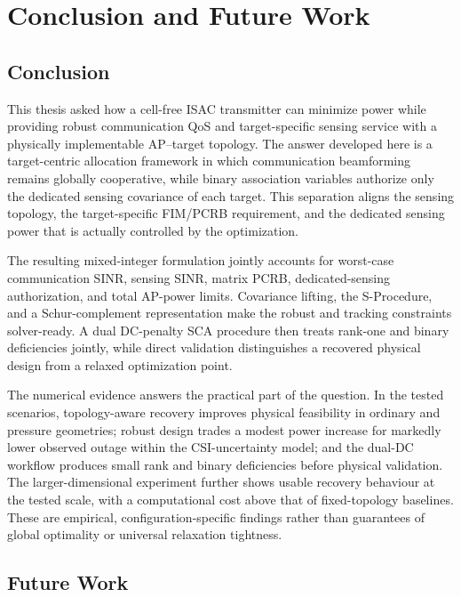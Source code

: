\chapter{Conclusion and Future Work}\label{ch:future_work}

\section{Conclusion}

This thesis asked how a cell-free ISAC transmitter can minimize power while
providing robust communication QoS and target-specific sensing service with a
physically implementable AP--target topology. The answer developed here is a
target-centric allocation framework in which communication beamforming remains
globally cooperative, while binary association variables authorize only the
dedicated sensing covariance of each target. This separation aligns the sensing
topology, the target-specific FIM/PCRB requirement, and the dedicated sensing
power that is actually controlled by the optimization.

The resulting mixed-integer formulation jointly accounts for worst-case
communication SINR, sensing SINR, matrix PCRB, dedicated-sensing authorization,
and total AP-power limits. Covariance lifting, the S-Procedure, and a
Schur-complement representation make the robust and tracking constraints
solver-ready. A dual DC-penalty SCA procedure then treats rank-one and binary
deficiencies jointly, while direct validation distinguishes a recovered
physical design from a relaxed optimization point.

The numerical evidence answers the practical part of the question. In the
tested scenarios, topology-aware recovery improves physical feasibility in
ordinary and pressure geometries; robust design trades a modest power increase
for markedly lower observed outage within the CSI-uncertainty model; and the
dual-DC workflow produces small rank and binary deficiencies before physical
validation. The larger-dimensional experiment further shows usable recovery
behaviour at the tested scale, with a computational cost above that of
fixed-topology baselines. These are empirical, configuration-specific findings
rather than guarantees of global optimality or universal relaxation tightness.

\section{Future Work}

